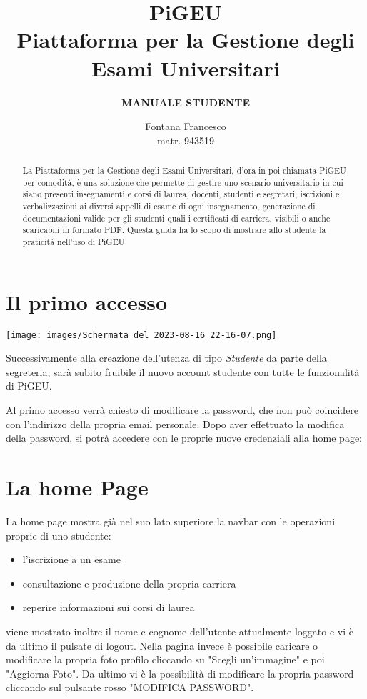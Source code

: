 \documentclass{article}
\title{PiGEU\\ Piattaforma per la Gestione degli Esami Universitari}
\author{\textbf{MANUALE STUDENTE}}
\date{Fontana Francesco \\ matr. 943519}
\begin{document}
    \maketitle

    \begin{abstract}

        La Piattaforma per la Gestione degli Esami Universitari, d'ora in poi chiamata PiGEU per comodità, è una soluzione che permette di gestire
        uno scenario universitario in cui siano presenti insegnamenti e corsi di laurea, docenti, studenti e segretari, iscrizioni e verbalizzazioni
        ai diversi appelli di esame di ogni insegnamento, generazione di documentazioni valide per gli studenti quali i certificati di carriera, visibili
        o anche scaricabili in formato PDF.
        Questa guida ha lo scopo di mostrare allo studente la praticità nell'uso di PiGEU
    \end{abstract}

    \tableofcontents

    \section{Il primo accesso}

    \texttt{[image: images/Schermata del 2023-08-16 22-16-07.png]}

    Successivamente alla creazione dell'utenza di tipo \textit{Studente} da parte della segreteria, sarà subito fruibile il nuovo account studente con tutte le funzionalità di PiGEU.

    Al primo accesso verrà chiesto di modificare la password, che non può coincidere con l'indirizzo della propria email personale. Dopo aver effettuato la modifica della password, si potrà accedere con le proprie nuove credenziali alla home page:

    \section{La home Page}
    La home page mostra già nel suo lato superiore la navbar con le operazioni proprie di uno studente:
    \begin{itemize}
        \item l'iscrizione a un esame
        \item consultazione e produzione della propria carriera
        \item reperire informazioni sui corsi di laurea
    \end{itemize}
    viene mostrato inoltre il nome e cognome dell'utente attualmente loggato e vi è da ultimo il pulsate di logout.
    Nella pagina invece è possibile caricare o modificare la propria foto profilo cliccando su "Scegli un'immagine" e poi "Aggiorna Foto".
    Da ultimo vi è la possibilità di modificare la propria password cliccando sul pulsante rosso "MODIFICA PASSWORD".
\end{document}
